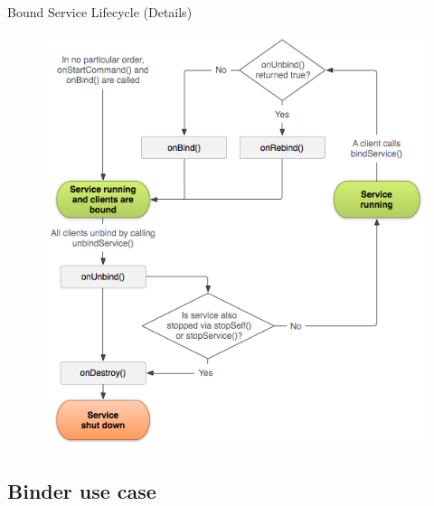 \documentclass{beamer}
\begin{document}
  \begin{frame}{Bound Service Lifecycle (Details)}
    \begin{figure}
      \includegraphics[width=0.56\linewidth]{figures/service_bound_lifecycle.png}
    \end{figure}
  \end{frame}

\subsection{Binder use case}
\end{document}
